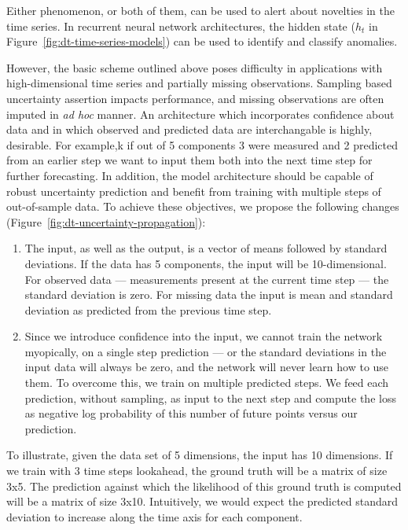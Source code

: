 \documentclass[runningheads]{llncs}
\begin{document}
Either phenomenon, or both of them, can be used to alert about novelties in the
time series. In recurrent neural network architectures, the hidden state ($h_t$
in Figure~\ref{fig:dt-time-series-models}) can be used to identify and classify
anomalies.

However, the basic scheme outlined above poses difficulty in applications with
high-dimensional time series and partially missing observations. Sampling based
uncertainty assertion impacts performance, and missing observations are often
imputed in \textit{ad hoc} manner. An architecture which
incorporates confidence about data and in which observed and
predicted data are interchangable is  highly, desirable. For example,k if out of 5 components 3 were
measured and 2 predicted from an earlier step we want to input
them both into the next time step for further forecasting. In
addition, the model architecture should be capable of robust uncertainty
prediction and benefit from training with multiple steps of out-of-sample data.
To achieve these objectives, we propose the following changes
(Figure~\ref{fig:dt-uncertainty-propagation}):

\begin{enumerate}
\item The input, as well as the output, is a vector of means followed
by standard deviations. If the data has 5 components, the input
will be 10-dimensional. For observed data --- measurements
present at the current time step --- the standard deviation is
zero. For missing data the input is mean and standard deviation
as predicted from the previous time step.

\item Since we introduce confidence into the input, we cannot train
the network myopically, on a single step prediction --- or the
standard deviations in the input data will always be zero, and
the network will never learn how to use them. To overcome this,
we train on multiple predicted steps. We feed each prediction,
without sampling, as input to the next step and compute the loss
as negative log probability of this number of future points versus our prediction.
\end{enumerate}

To illustrate, given the data set of 5 dimensions, the input has 10
dimensions. If we train with 3 time steps lookahead, the ground
truth will be a matrix of size 3x5. The prediction against
which the likelihood of this ground truth is computed will be
a matrix of size 3x10. Intuitively, we would expect the
predicted standard deviation to increase along the time axis
for each component.
\end{document}
